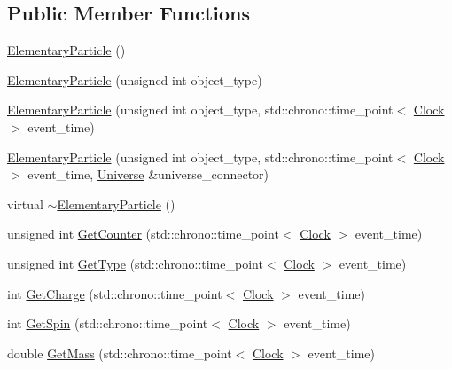 \subsection*{Public Member Functions}
\begin{DoxyCompactItemize}
\item 
\mbox{\hyperlink{classElementaryParticle_a4035ffd6ce053ea3390632fa530c6e21}{Elementary\+Particle}} ()
\item 
\mbox{\hyperlink{classElementaryParticle_a6bd3ad699e15769c1860e3068020a824}{Elementary\+Particle}} (unsigned int object\+\_\+type)
\item 
\mbox{\hyperlink{classElementaryParticle_a371e2742ab8b5ce0fe55ef4adbaed3af}{Elementary\+Particle}} (unsigned int object\+\_\+type, std\+::chrono\+::time\+\_\+point$<$ \mbox{\hyperlink{universe_8h_a0ef8d951d1ca5ab3cfaf7ab4c7a6fd80}{Clock}} $>$ event\+\_\+time)
\item 
\mbox{\hyperlink{classElementaryParticle_a0b43033247b36096d0de2a7553c620a9}{Elementary\+Particle}} (unsigned int object\+\_\+type, std\+::chrono\+::time\+\_\+point$<$ \mbox{\hyperlink{universe_8h_a0ef8d951d1ca5ab3cfaf7ab4c7a6fd80}{Clock}} $>$ event\+\_\+time, \mbox{\hyperlink{classUniverse}{Universe}} \&universe\+\_\+connector)
\item 
virtual \mbox{\hyperlink{classElementaryParticle_a5adce47bf88a5381c88a4d40f87fe76f}{$\sim$\+Elementary\+Particle}} ()
\item 
unsigned int \mbox{\hyperlink{classElementaryParticle_a371b9b9bc520047c42d9e6d06b7f3dd9}{Get\+Counter}} (std\+::chrono\+::time\+\_\+point$<$ \mbox{\hyperlink{universe_8h_a0ef8d951d1ca5ab3cfaf7ab4c7a6fd80}{Clock}} $>$ event\+\_\+time)
\item 
unsigned int \mbox{\hyperlink{classElementaryParticle_a63fe7df86d2fba4a64a69dfa5757e94e}{Get\+Type}} (std\+::chrono\+::time\+\_\+point$<$ \mbox{\hyperlink{universe_8h_a0ef8d951d1ca5ab3cfaf7ab4c7a6fd80}{Clock}} $>$ event\+\_\+time)
\item 
int \mbox{\hyperlink{classElementaryParticle_af3ebb984cfe957b2e76463c22e4b5bb5}{Get\+Charge}} (std\+::chrono\+::time\+\_\+point$<$ \mbox{\hyperlink{universe_8h_a0ef8d951d1ca5ab3cfaf7ab4c7a6fd80}{Clock}} $>$ event\+\_\+time)
\item 
int \mbox{\hyperlink{classElementaryParticle_ad5f5a05770f94f4c8fee418d59098126}{Get\+Spin}} (std\+::chrono\+::time\+\_\+point$<$ \mbox{\hyperlink{universe_8h_a0ef8d951d1ca5ab3cfaf7ab4c7a6fd80}{Clock}} $>$ event\+\_\+time)
\item 
double \mbox{\hyperlink{classElementaryParticle_a85400dc97f66c1ce23d9d961ddb6b8f3}{Get\+Mass}} (std\+::chrono\+::time\+\_\+point$<$ \mbox{\hyperlink{universe_8h_a0ef8d951d1ca5ab3cfaf7ab4c7a6fd80}{Clock}} $>$ event\+\_\+time)

\end{DoxyCompactItemize}
